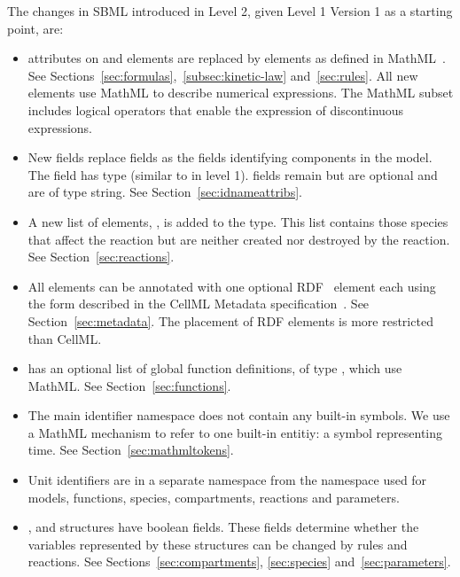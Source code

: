 \documentclass[10pt]{cekarticle}
\begin{document}
The changes in SBML introduced in Level 2, given Level 1 Version 1
as a starting point, are:

\begin{itemize}
\item {} attributes on  and
 elements are replaced by  elements as
defined in MathML~\citep{w3c:2000b}.  See
Sections~\ref{sec:formulas},~\ref{subsec:kinetic-law}
and~\ref{sec:rules}.  All new elements use MathML to describe
numerical expressions.  The MathML subset includes logical operators that enable the expression of discontinuous expressions.

\item New  fields replace  fields as the
fields identifying components in the model. The  field
has type  (similar to  in level 1).
 fields remain but are optional and are of type
string.  See Section~\ref{sec:idnameattribs}.

\item A new list of elements, , is added
to the  type.  This list contains those species
that affect the reaction but are neither created nor destroyed by
the reaction.  See Section~\ref{sec:reactions}.

\item All elements can be annotated with one optional
RDF~\citep{lassila:1999} element each using the form described in
the CellML Metadata specification~\citep{cuellar:2002}.  See
Section~\ref{sec:metadata}.  The placement of RDF elements is more
restricted than CellML.

\item {} has an optional list of global function
definitions, of type , which use MathML. See
Section~\ref{sec:functions}.

\item The main identifier namespace does not contain any built-in
symbols.  We use a MathML mechanism to refer to one built-in entitiy: a symbol representing time. See Section~\ref{sec:mathmltokens}.

\item Unit identifiers are in a separate namespace from the
namespace used for models, functions, species, compartments,
reactions and parameters.

\item {},  and 
structures have boolean  fields.  These fields
determine whether the variables represented by these structures
can be changed by rules and reactions.  See
Sections~\ref{sec:compartments}, \ref{sec:species}
and~\ref{sec:parameters}.


\end{itemize}
\end{document}
